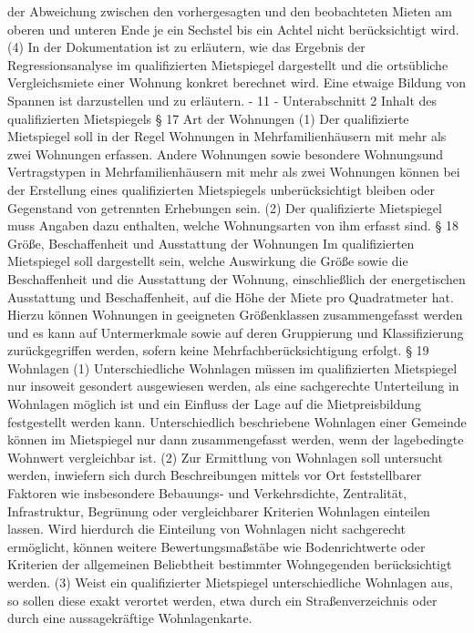der Abweichung zwischen den vorhergesagten und den beobachteten Mieten am oberen
und unteren Ende je ein Sechstel bis ein Achtel nicht berücksichtigt wird.
(4) In der Dokumentation ist zu erläutern, wie das Ergebnis der Regressionsanalyse
im qualifizierten Mietspiegel dargestellt und die ortsübliche Vergleichsmiete einer Wohnung
konkret berechnet wird. Eine etwaige Bildung von Spannen ist darzustellen und zu erläutern.
- 11 -
Unterabschnitt 2
Inhalt des qualifizierten Mietspiegels
§ 17
Art der Wohnungen
(1) Der qualifizierte Mietspiegel soll in der Regel Wohnungen in Mehrfamilienhäusern
mit mehr als zwei Wohnungen erfassen. Andere Wohnungen sowie besondere Wohnungsund Vertragstypen in Mehrfamilienhäusern mit mehr als zwei Wohnungen können bei der
Erstellung eines qualifizierten Mietspiegels unberücksichtigt bleiben oder Gegenstand von
getrennten Erhebungen sein.
(2) Der qualifizierte Mietspiegel muss Angaben dazu enthalten, welche Wohnungsarten von ihm erfasst sind.
§ 18
Größe, Beschaffenheit und Ausstattung der Wohnungen
Im qualifizierten Mietspiegel soll dargestellt sein, welche Auswirkung die Größe sowie
die Beschaffenheit und die Ausstattung der Wohnung, einschließlich der energetischen
Ausstattung und Beschaffenheit, auf die Höhe der Miete pro Quadratmeter hat. Hierzu können Wohnungen in geeigneten Größenklassen zusammengefasst werden und es kann auf
Untermerkmale sowie auf deren Gruppierung und Klassifizierung zurückgegriffen werden,
sofern keine Mehrfachberücksichtigung erfolgt.
§ 19
Wohnlagen
(1) Unterschiedliche Wohnlagen müssen im qualifizierten Mietspiegel nur insoweit gesondert ausgewiesen werden, als eine sachgerechte Unterteilung in Wohnlagen möglich ist
und ein Einfluss der Lage auf die Mietpreisbildung festgestellt werden kann. Unterschiedlich
beschriebene Wohnlagen einer Gemeinde können im Mietspiegel nur dann zusammengefasst werden, wenn der lagebedingte Wohnwert vergleichbar ist.
(2) Zur Ermittlung von Wohnlagen soll untersucht werden, inwiefern sich durch Beschreibungen mittels vor Ort feststellbarer Faktoren wie insbesondere Bebauungs- und Verkehrsdichte, Zentralität, Infrastruktur, Begrünung oder vergleichbarer Kriterien Wohnlagen
einteilen lassen. Wird hierdurch die Einteilung von Wohnlagen nicht sachgerecht ermöglicht, können weitere Bewertungsmaßstäbe wie Bodenrichtwerte oder Kriterien der allgemeinen Beliebtheit bestimmter Wohngegenden berücksichtigt werden.
(3) Weist ein qualifizierter Mietspiegel unterschiedliche Wohnlagen aus, so sollen
diese exakt verortet werden, etwa durch ein Straßenverzeichnis oder durch eine aussagekräftige Wohnlagenkarte.
